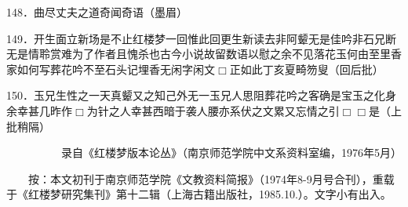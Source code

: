 148．曲尽丈夫之道奇闻奇语{（\kaishu 墨眉）}

149．开生面立新场是不止红楼梦一回惟此回更生新读去非阿颦无是佳吟非石兄断无是情聆赏难为了作者且愧杀也古今小说故留数语以慰之余不见落花玉何由至里香家如何写葬花吟不至石头记埋香无闲字闲文{$\Box$}正如此丁亥夏畸笏叟{（\kaishu 回后批）}

150．玉兄生性之一天真颦又之知己外无一玉兄人思阻葬花吟之客确是宝玉之化身余幸甚几昨作{$\Box$}为针之人幸甚西暗于袭人腰亦系伏之文累又忘情之引{$\Box\Box$}是{（\kaishu 上批稍隔）}

{　　　　　录自《红楼梦版本论丛》（南京师范学院中文系资料室编，1976年5月）}

{　　按：本文初刊于南京师范学院《文教资料简报》（1974年8-9月号合刊），重载于《红楼梦研究集刊》第十二辑（上海古籍出版社，1985.10.）。文字小有出入。}
